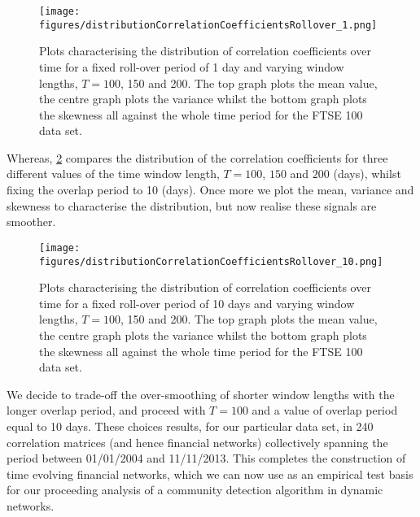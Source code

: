 \begin{figure}
	\centering
	\texttt{[image: figures/distributionCorrelationCoefficientsRollover\_1.png]}
	\caption[Plots characterising the distribution of correlation coefficients for a fixed roll-over period of 1 day and varying window lengths.]{\label{fig:distributionCorrelationCoefficientsRollover1} Plots characterising the distribution of correlation coefficients over time for a fixed roll-over period of 1 day and varying window lengths, $T=100$, 150 and 200. The top graph plots the mean value, the centre graph plots the variance whilst the bottom graph plots the skewness all against the whole time period for the FTSE 100 data set.}
\end{figure}

Whereas, \cref{fig:distributionCorrelationCoefficientsRollover10} compares the distribution of the correlation coefficients for three different values of the time window length, $T=100$, $150$ and $200$ (days), whilst fixing the overlap period to 10 (days).
Once more we plot the mean, variance and skewness to characterise the distribution, but now realise these signals are smoother.

\begin{figure}
	\centering
	\texttt{[image: figures/distributionCorrelationCoefficientsRollover\_10.png]}
	\caption[Plots characterising the distribution of correlation coefficients for a fixed roll-over period of 10 days and varying window lengths.]{\label{fig:distributionCorrelationCoefficientsRollover10} Plots characterising the distribution of correlation coefficients over time for a fixed roll-over period of 10 days and varying window lengths, $T=100$, 150 and 200. The top graph plots the mean value, the centre graph plots the variance whilst the bottom graph plots the skewness all against the whole time period for the FTSE 100 data set.}
\end{figure}

We decide to trade-off the over-smoothing of shorter window lengths with the longer overlap period, and proceed with $T=100$ and a value of overlap period equal to 10 days.
These choices results, for our particular data set, in 240 correlation matrices (and hence financial networks) collectively spanning the period between 01/01/2004 and 11/11/2013.
This completes the construction of time evolving financial networks, which we can now use as an empirical test basis for our proceeding analysis of a community detection algorithm in dynamic networks.

